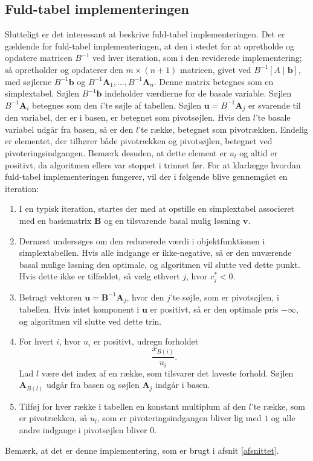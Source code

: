 \subsection{Fuld-tabel implementeringen}
Slutteligt er det interessant at beskrive fuld-tabel implementeringen. 
Det er gældende for fuld-tabel implementeringen, at den i stedet for at opretholde og opdatere matricen $B^{-1}$ ved hver iteration, som i den reviderede implementering; 
så opretholder og opdaterer den $m \times (n+1)$ matricen, givet ved $B^{-1} \left [ A \mid \mathbf{b} \right ]$, med søjlerne $B^{-1}\mathbf{b}$ og $B^{-1}\mathbf{A}_1,\ldots,B^{-1}\mathbf{A}_n$. 
Denne matrix betegnes som en simplextabel.
Søjlen $B^{-1}\mathbf{b}$ indeholder værdierne for de basale variable.
Søjlen $B^{-1}\mathbf{A}_i$ betegnes som den $i$'te søjle af tabellen.
Søjlen $\mathbf{u} = B^{-1}\mathbf{A}_j$ er svarende til den variabel, der er i basen, er betegnet som pivotsøjlen. 
Hvis den $l$'te basale variabel udgår fra basen, så er den $l$'te række, betegnet som pivotrækken. 
Endelig er elementet, der tilhører både pivotrækken og pivotsøjlen, betegnet ved pivoteringsindgangen.
Bemærk desuden, at dette element er $u_l$ og altid er positivt, da algoritmen ellers var stoppet i trinnet før. 
For at klarlægge hvordan fuld-tabel implementeringen fungerer, vil der i følgende blive gennemgået en iteration: 
%
\begin{tcolorbox}[
title=Fuld-tabel implementering,
colback		= myblue!15,
colframe	= myblue!15,
coltitle	= black,
before skip	= 20pt plus 2pt,
after skip	= 20pt plus 2pt,
fonttitle	= \bfseries]
\begin{enumerate}
\item I en typisk iteration, startes der med at opstille en simplextabel associeret med en basismatrix $\mathbf{B}$ og en tilsvarende basal mulig løsning $\mathbf{v}.$
\item Dernæst undersøges om den reducerede værdi i objektfunktionen i simplextabellen.
Hvis alle indgange er ikke-negative, så er den nuværende basal mulige løsning den optimale, og algoritmen vil slutte ved dette punkt.
Hvis dette ikke er tilfældet, så vælg ethvert $j$, hvor $c_j^* < 0$.
\item Betragt vektoren $\mathbf{u}=\mathbf{B}^{-1}\mathbf{A}_j$, hvor den $j$'te søjle, som er pivotsøjlen, i tabellen. Hvis intet komponent i $\mathbf{u}$ er positivt, så er den optimale pris $-\infty$, og algoritmen vil slutte ved dette trin. 
\item For hvert $i$, hvor $u_i$ er positivt, udregn forholdet $$\frac{x_{B(i)}}{u_i}.$$ Lad $l$ være det index  af en række, som tilsvarer det laveste forhold.
Søjlen $\mathbf{A}_{B(l)}$ udgår fra basen og søjlen $\mathbf{A}_j$ indgår i basen. 
\item Tilføj for hver række i tabellen en konstant multiplum af den $l$'te række, som er pivotrækken, så $u_l$, som er pivoteringsindgangen bliver lig med $1$ og alle andre indgange i pivotsøjlen bliver $0$. 
\end{enumerate}
\end{tcolorbox}
\noindent
%
Bemærk, at det er denne implementering, som er brugt i afsnit \ref{afsnittet}.